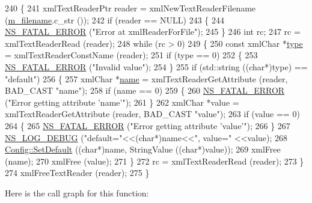 \begin{DoxyCode}
240 \{
241   xmlTextReaderPtr reader = xmlNewTextReaderFilename (\hyperlink{classns3_1_1XmlConfigLoad_a8214344f421f9916919684829b0a129a}{m\_filename}.c\_str ());
242   \textcolor{keywordflow}{if} (reader == NULL)
243     \{
244       \hyperlink{group__fatal_ga5131d5e3f75d7d4cbfd706ac456fdc85}{NS\_FATAL\_ERROR} (\textcolor{stringliteral}{"Error at xmlReaderForFile"});
245     \}
246   \textcolor{keywordtype}{int} rc;
247   rc = xmlTextReaderRead (reader);
248   \textcolor{keywordflow}{while} (rc > 0)
249     \{
250       \textcolor{keyword}{const} xmlChar *\hyperlink{visualizer-ideas_8txt_add98db9e15e2a58cf2b57623e7aa893a}{type} = xmlTextReaderConstName (reader);
251       \textcolor{keywordflow}{if} (type == 0)
252         \{
253           \hyperlink{group__fatal_ga5131d5e3f75d7d4cbfd706ac456fdc85}{NS\_FATAL\_ERROR} (\textcolor{stringliteral}{"Invalid value"});
254         \}
255       \textcolor{keywordflow}{if} (std::string ((\textcolor{keywordtype}{char}*)type) == \textcolor{stringliteral}{"default"})
256         \{
257           xmlChar *\hyperlink{generate__test__data__lte__spectrum__model_8m_ab74e6bf80237ddc4109968cedc58c151}{name} = xmlTextReaderGetAttribute (reader, BAD\_CAST \textcolor{stringliteral}{"name"});
258           \textcolor{keywordflow}{if} (name == 0)
259             \{
260               \hyperlink{group__fatal_ga5131d5e3f75d7d4cbfd706ac456fdc85}{NS\_FATAL\_ERROR} (\textcolor{stringliteral}{"Error getting attribute 'name'"});
261             \}
262           xmlChar *value = xmlTextReaderGetAttribute (reader, BAD\_CAST \textcolor{stringliteral}{"value"});
263           \textcolor{keywordflow}{if} (value == 0)
264             \{
265               \hyperlink{group__fatal_ga5131d5e3f75d7d4cbfd706ac456fdc85}{NS\_FATAL\_ERROR} (\textcolor{stringliteral}{"Error getting attribute 'value'"});
266             \}
267           \hyperlink{group__logging_ga413f1886406d49f59a6a0a89b77b4d0a}{NS\_LOG\_DEBUG} (\textcolor{stringliteral}{"default="}<<(\textcolor{keywordtype}{char}*)name<<\textcolor{stringliteral}{", value="} <<value);
268           \hyperlink{group__config_ga2e7882df849d8ba4aaad31c934c40c06}{Config::SetDefault} ((\textcolor{keywordtype}{char}*)name, StringValue ((\textcolor{keywordtype}{char}*)value));
269           xmlFree (name);
270           xmlFree (value);
271         \}
272       rc = xmlTextReaderRead (reader);
273     \}
274   xmlFreeTextReader (reader);
275 \}
\end{DoxyCode}


Here is the call graph for this function\+:


